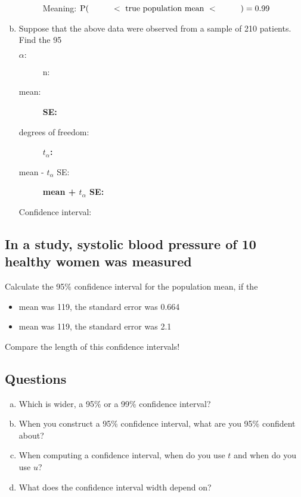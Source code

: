 \begin{enumerate}[a)]
\begin{description}
		Meaning: $\P(\hspace{3em}< \textrm{ true population mean } < \hspace{3em}) = 0.99$
	\end{description}

\item Suppose that the above data were observed from a sample of 210 patients. Find the 95%
	\begin{description}
	\item[$\alpha:$] \hrulefill\quad n: 	\hrulefill
	\item[mean:] \hrulefill\quad \textbf{SE:} \hrulefill
	\item[degrees of freedom:]  \hrulefill\quad \textbf{$t_\alpha$:} \hrulefill
	\item[mean - $t_\alpha$ SE:] \hrulefill \quad\quad \textbf{mean + $t_\alpha$ SE:} \hrulefill
	\item[Confidence interval:] \hrulefill
	\end{description}		
\end{enumerate}

	


	
\subsection{In a study, systolic blood pressure of 10 healthy women was measured}
Calculate the 95\% confidence interval for the population mean,  if the 

\begin{itemize}
 \item  mean was 119, the standard error was 0.664
 
  \hrulefill
 \item  mean was 119, the standard error was 2.1
 
 	\hrulefill
\end{itemize}
Compare the length of this confidence intervals!

\noindent \hrulefill
\subsection{Questions}

	
\begin{enumerate}[a)]
\item Which is wider, a 95\% or a 99\% confidence interval? 	

 \hrulefill
\item   When you construct a 95\% confidence interval, what are you 95\% confident about? 	

	 \hrulefill
\item When computing a confidence interval, when do you use $t$ and when do you use $u$? 	

\hrulefill
\item What does the confidence interval width depend on? 	

\hrulefill
\end{enumerate}

